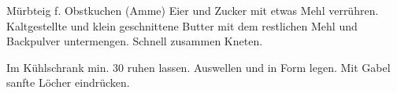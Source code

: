 \begin{MyRecipe}{Mürbteig f. Obstkuchen (Amme)}{}{}
	Eier und Zucker mit etwas Mehl verrühren. Kaltgestellte und klein geschnittene Butter mit dem restlichen Mehl und Backpulver untermengen. Schnell zusammen Kneten.\par\bigskip
	
	
	Im Kühlschrank min. \SI{30}{\minuteprime} ruhen lassen. Auswellen und in Form legen. Mit Gabel sanfte Löcher eindrücken.
\end{MyRecipe}